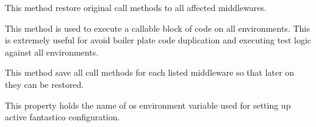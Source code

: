 \documentclass[letterpaper,10pt,english]{sphinxmanual}
\begin{document}
\begin{fulllineitems}
\begin{fulllineitems}
\label{get_started/contribute:fantastico.tests.base_case.FantasticoIntegrationTestCase._restore_call_methods}
This method restore original call methods to all affected middlewares.

\end{fulllineitems}


\begin{fulllineitems}
\label{get_started/contribute:fantastico.tests.base_case.FantasticoIntegrationTestCase._run_test_all_envs}
This method is used to execute a callable block of code on all environments. This is extremely useful for
avoid boiler plate code duplication and executing test logic against all environments.

\end{fulllineitems}


\begin{fulllineitems}
\label{get_started/contribute:fantastico.tests.base_case.FantasticoIntegrationTestCase._save_call_methods}
This method save all call methods for each listed middleware so that later on they can be restored.

\end{fulllineitems}


\begin{fulllineitems}
\label{get_started/contribute:fantastico.tests.base_case.FantasticoIntegrationTestCase.fantastico_cfg_os_key}
This property holds the name of os environment variable used for setting up active fantastico configuration.

\end{fulllineitems}


\end{fulllineitems}

\end{document}
